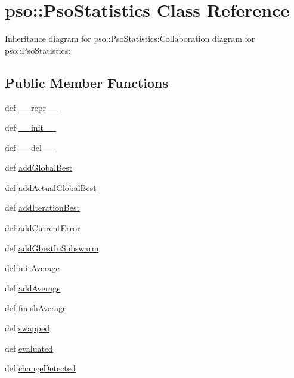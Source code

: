 \hypertarget{classpso_1_1PsoStatistics}{
\section{pso::PsoStatistics Class Reference}
\label{classpso_1_1PsoStatistics}
}
Inheritance diagram for pso::PsoStatistics:Collaboration diagram for pso::PsoStatistics:\subsection*{Public Member Functions}
\begin{CompactItemize}
\item 
def \hyperlink{classpso_1_1PsoStatistics_6a331c480554810f4d378e4c72ab5df6}{\_\-\_\-repr\_\-\_\-}
\item 
def \hyperlink{classpso_1_1PsoStatistics_5ebd13cc8e53e3db6b09d161d72f7238}{\_\-\_\-init\_\-\_\-}
\item 
def \hyperlink{classpso_1_1PsoStatistics_b872eaee3a5d4cf6d17329d66026376f}{\_\-\_\-del\_\-\_\-}
\item 
def \hyperlink{classpso_1_1PsoStatistics_9efa2773213fe1dd5814325ee1da52e2}{addGlobalBest}
\item 
def \hyperlink{classpso_1_1PsoStatistics_63cd49a545868fa865767746772095b5}{addActualGlobalBest}
\item 
def \hyperlink{classpso_1_1PsoStatistics_235a7e312e793be9f08bb031f09900f1}{addIterationBest}
\item 
def \hyperlink{classpso_1_1PsoStatistics_72abb915b5886d0115bd31678a9640d9}{addCurrentError}
\item 
def \hyperlink{classpso_1_1PsoStatistics_8c3711e402ae0d40056da9b57344dbed}{addGbestInSubswarm}
\item 
def \hyperlink{classpso_1_1PsoStatistics_2945938ad0f68ed7d9abb6e1d16d265e}{initAverage}
\item 
def \hyperlink{classpso_1_1PsoStatistics_14aa03cf98eabb303b7df14e4ffc4c4f}{addAverage}
\item 
def \hyperlink{classpso_1_1PsoStatistics_f4d51eaf6d7818220c9f5cd52c9ec20e}{finishAverage}
\item 
def \hyperlink{classpso_1_1PsoStatistics_46948a7f8d97e9113b2867d36d24eb5a}{swapped}
\item 
def \hyperlink{classpso_1_1PsoStatistics_150788c91afd268ed92c36521d8fe9d7}{evaluated}
\item 
def \hyperlink{classpso_1_1PsoStatistics_cc07f2679c9747fada68f8c656f1ebd0}{changeDetected}

\end{CompactItemize}
